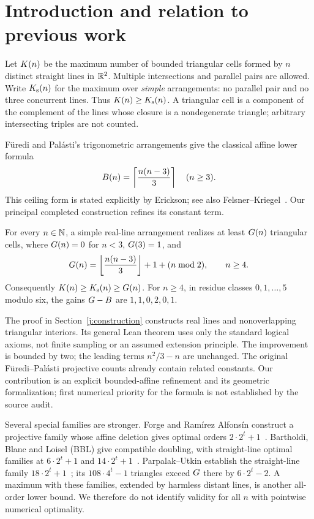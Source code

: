\section{Introduction and relation to previous work}

Let $K(n)$ be the maximum number of bounded triangular cells formed by $n$ distinct straight lines in $\mathbb R^2$. Multiple intersections and parallel pairs are allowed. Write $K_{\mathrm s}(n)$ for the maximum over \emph{simple} arrangements: no parallel pair and no three concurrent lines. Thus $K(n)\ge K_{\mathrm s}(n)$. A triangular cell is a component of the complement of the lines whose closure is a nondegenerate triangle; arbitrary intersecting triples are not counted.

F\"uredi and Pal\'asti's trigonometric arrangements give the classical affine lower formula
\[
 B(n)=\left\lceil\frac{n(n-3)}3\right\rceil\quad(n\ge3).
\]
This ceiling form is stated explicitly by Erickson; see also Felsner--Kriegel~\cite{furedipalasti1984,erickson1999,felsnerkriegel1999}. Our principal completed construction refines its constant term.

\begin{theorem}\label{j:main}
For every $n\in\mathbb N$, a simple real-line arrangement realizes at least $G(n)$ triangular cells, where $G(n)=0$ for $n<3$, $G(3)=1$, and
\begin{equation}\label{j:G}
 G(n)=\left\lfloor\frac{n(n-3)}3\right\rfloor+1+(n\bmod2),\qquad n\ge4.
\end{equation}
Consequently $K(n)\ge K_{\mathrm s}(n)\ge G(n)$. For $n\ge4$, in residue classes $0,1,\ldots,5$ modulo six, the gains $G-B$ are $1,1,0,2,0,1$.
\end{theorem}

The proof in Section~\ref{j:construction} constructs real lines and nonoverlapping triangular interiors. Its general Lean theorem uses only the standard logical axioms, not finite sampling or an assumed extension principle. The improvement is bounded by two; the leading terms $n^2/3-n$ are unchanged. The original F\"uredi--Pal\'asti projective counts already contain related constants. Our contribution is an explicit bounded-affine refinement and its geometric formalization; first numerical priority for the formula is not established by the source audit.

Several special families are stronger. Forge and Ram\'irez Alfons\'in construct a projective family whose affine deletion gives optimal orders $2\cdot2^t+1$~\cite{forge1998}. Bartholdi, Blanc and Loisel (BBL) give compatible doubling, with straight-line optimal families at $6\cdot2^t+1$ and $14\cdot2^t+1$~\cite{bbl2008}. Parpalak--Utkin establish the straight-line family $18\cdot2^t+1$~\cite{parpalakutkin2026}; its $108\cdot4^t-1$ triangles exceed $G$ there by $6\cdot2^t-2$. A maximum with these families, extended by harmless distant lines, is another all-order lower bound. We therefore do not identify validity for all $n$ with pointwise numerical optimality.

